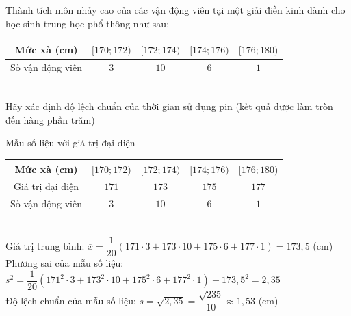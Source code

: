 \begin{ex}%
	Thành tích môn nhảy cao của các vận động viên tại một giải điền kinh dành cho học sinh trung học phổ thông như sau:\\
	\begin{tabular}{|c|c|c|c|c|}
		\hline
		Mức xà (cm) & $[170;172)$ & $[172;174)$ & $[174;176)$& $[176;180)$ \\
		\hline
		Số vận động viên & $3$  & $10$ & $6$ & $1$   \\
		\hline
	\end{tabular}\\
	Hãy xác định độ lệch chuẩn của thời gian sử dụng pin (kết quả được làm tròn đến hàng phần trăm) 
	
	\loigiai
	{
		Mẫu số liệu với giá trị đại diện\\
		\begin{tabular}{|c|c|c|c|c| }
			\hline
			Mức xà (cm) & $[170;172)$ & $[172;174)$ & $[174;176)$& $[176;180)$ \\
			\hline
			Giá trị đại diện & $171$  & $173$ & $175$ & $177$   \\
			\hline
			Số vận động viên & $3$  & $10$ & $6$ & $1$   \\
			\hline
		\end{tabular}\\
		Giá trị trung bình: $\overline x = \dfrac{1}{20}(171\cdot 3 + 173\cdot 10 + 175\cdot 6 + 177\cdot 1) = 173{,}5$ (cm) \\
		Phương sai của mẫu số liệu:\\
		${s^2} = \dfrac{1}{20}( 171^2\cdot 3 + 173^2\cdot 10 + 175^2\cdot 6 + 177^2\cdot 1) - 173{,}5^2 = 2{,}35$\\
		Độ lệch chuẩn của mẫu số liệu: $s = \sqrt {2{,}35}  = \dfrac{{\sqrt {235} }}{{10}} \approx 1{,}53$ (cm)
		
	}
\end{ex}

